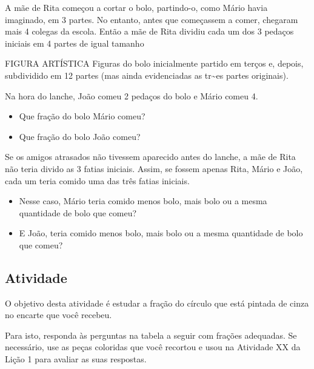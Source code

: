 \documentclass[a4,12pt]{book}
\begin{document}
A mãe de Rita começou a cortar o bolo, partindo-o, como Mário havia imaginado, em 3 partes. No entanto, antes que começassem a comer, chegaram mais 4 colegas da escola. Então a mãe de Rita dividiu cada um dos 3 pedaços iniciais em 4 partes de igual tamanho 

\begin{imagem*}[breakable]{}{}   FIGURA ARTÍSTICA  
  Figuras do bolo inicialmente partido em terços e, depois, subdividido em 12 partes (mas ainda evidenciadas as tr\textasciitilde{}es partes originais).   
\end{imagem*}

Na hora do lanche, João comeu 2 pedaços do bolo e Mário comeu 4.
\begin{itemize} %
  \item     Que fração do bolo Mário comeu?
  \item     Que fração do bolo João comeu?
\end{itemize} %

Se os amigos atrasados não tivessem aparecido antes do lanche, a mãe de Rita não teria divido as 3 fatias iniciais. Assim, se fossem apenas Rita, Mário e João, cada um teria comido uma das três fatias iniciais.
\begin{itemize} %
  \item     Nesse caso, Mário teria comido menos bolo, mais bolo ou a mesma quantidade de bolo que comeu?
  \item     E João, teria comido menos bolo, mais bolo ou a mesma quantidade de bolo que comeu?
\end{itemize} %


\subsection{Atividade}

O objetivo desta atividade é estudar a fração do círculo que está pintada de cinza no encarte que você recebeu.

\begin{center}
\end{center}

Para isto, responda às perguntas na tabela a seguir com frações adequadas. Se necessário, use as peças coloridas que você recortou e usou na Atividade XX da Lição 1 para avaliar as suas respostas. 
\end{document}
